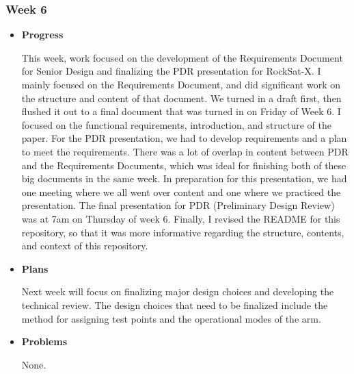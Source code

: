 \subsubsection{Week 6}
\begin{itemize}
\item{
\textbf{Progress}

This week, work focused on the development of the Requirements Document for Senior Design and finalizing the PDR presentation for RockSat-X. I mainly focused on the Requirements Document, and did significant work on the structure and content of that document. We turned in a draft first, then flushed it out to a final document that was turned in on Friday of Week 6. I focused on the functional requirements, introduction, and structure of the paper. For the PDR presentation, we had to develop requirements and a plan to meet the requirements. There was a lot of overlap in content between PDR and the Requirements Documents, which was ideal for finishing both of these big documents in the same week. In preparation for this presentation, we had one meeting where we all went over content and one where we practiced the presentation. The final presentation for PDR (Preliminary Design Review) was at 7am on Thursday of week 6. Finally, I revised the README for this repository, so that it was more informative regarding the structure, contents, and context of this repository.
}
\item{
\textbf{Plans}

Next week will focus on finalizing major design choices and developing the technical review. The design choices that need to be finalized include the method for assigning test points and the operational modes of the arm.
}
\item{
\textbf{Problems}

None.
}
\end{itemize}

